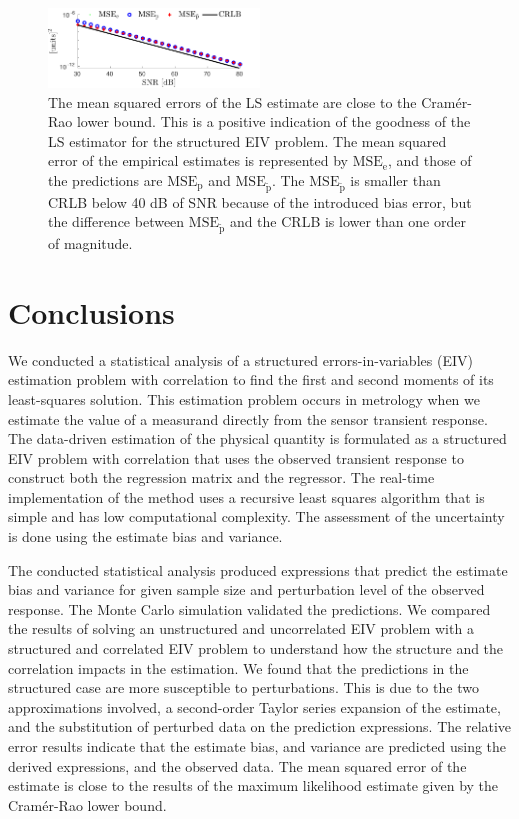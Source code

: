 \begin{figure}[!htpb]
\centering
\includegraphics[width=0.5\textwidth]{./ChapterStatisticalAnalysis/fig/Fig_9.pdf}
\caption{\label{fig:MSE_CRLB}
The mean squared errors of the LS estimate are close to the Cram\'er-Rao lower bound. This is a positive indication of the goodness of the LS estimator for the structured EIV problem. The mean squared error of the empirical estimates is represented by $\mathrm{MSE}_{\mathrm{e}}$, and those of the predictions are $\mathrm{MSE}_{\mathrm{p}}$ and $\mathrm{MSE}_{\widetilde{\mathrm{p}}}$. The $\mathrm{MSE}_{\widetilde{\mathrm{p}}}$ is smaller than CRLB below 40 dB of SNR because of the introduced bias error, but the difference between $\mathrm{MSE}_{\widetilde{\mathrm{p}}}$ and the CRLB is lower than one order of magnitude.}
\end{figure}


\section{Conclusions}

 We conducted a statistical analysis of a structured errors-in-variables (EIV) estimation problem with correlation to find the first and second moments of its least-squares solution.
This estimation problem occurs in metrology when we estimate the value of a measurand directly from the sensor transient response.
The data-driven estimation of the physical quantity is formulated as a structured EIV problem with correlation that uses the observed transient response to construct both the regression matrix and the regressor.
The real-time implementation of the method uses a recursive least squares algorithm that is simple and has low computational complexity.
The assessment of the uncertainty is done using the estimate bias and variance.

The conducted statistical analysis produced expressions that predict the estimate bias and variance for given sample size and perturbation level of the observed response.
The Monte Carlo simulation validated the predictions.
We compared the results of solving an unstructured and uncorrelated EIV problem with a structured and correlated EIV problem to understand how the structure and the correlation impacts in the estimation.
We found that the predictions in the structured case are more susceptible to perturbations.
This is due to the two approximations involved, a second-order Taylor series expansion of the estimate, and the substitution of perturbed data on the prediction expressions.
The relative error results indicate that the estimate bias, and variance are predicted using the derived expressions, and the observed data.
The mean squared error of the estimate is close to the results of the maximum likelihood estimate given by the Cram\'er-Rao lower bound.

